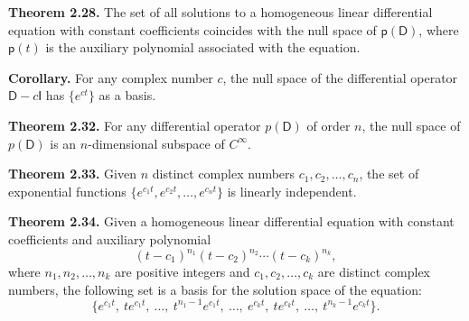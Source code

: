 \documentclass{article}
\newcommand{\0}{\mathit{0}}
\begin{document}
\textbf{Theorem 2.28.} The set of all solutions to a homogeneous linear differential equation
with constant coefficients coincides with the null space of $\mathsf{p}(\mathsf{D})$,
where $\mathsf{p}(t)$ is the auxiliary polynomial associated with the equation.

\textbf{Corollary.} For any complex number $c$, the null space of the differential operator
$\mathsf{D} - c\mathsf{I}$ has $\{e^{ct}\}$ as a basis.

\textbf{Theorem 2.32.} For any differential operator $p(\mathsf{D})$ of order $n$,
the null space of $p(\mathsf{D})$ is an $n$-dimensional subspace of $C^\infty$.

\textbf{Theorem 2.33.} Given $n$ distinct complex numbers $c_1, c_2, \dots, c_n$,
the set of exponential functions $\{e^{c_1 t}, e^{c_2 t}, \dots, e^{c_n t}\}$ is linearly independent.

\textbf{Theorem 2.34.} Given a homogeneous linear differential equation with 
constant coefficients and auxiliary polynomial
\[
(t - c_1)^{n_1}(t - c_2)^{n_2} \cdots (t - c_k)^{n_k},
\]
where $n_1, n_2, \dots, n_k$ are positive integers and $c_1, c_2, \dots, c_k$ are distinct 
complex numbers, the following set is a basis for the solution space of the equation:
\[
\{e^{c_1 t},\ te^{c_1 t},\ \dots,\ t^{n_1 - 1}e^{c_1 t},\ \dots,\ e^{c_k t},\ te^{c_k t},\ \dots,\ t^{n_k - 1}e^{c_k t}\}.
\]
\end{document}
